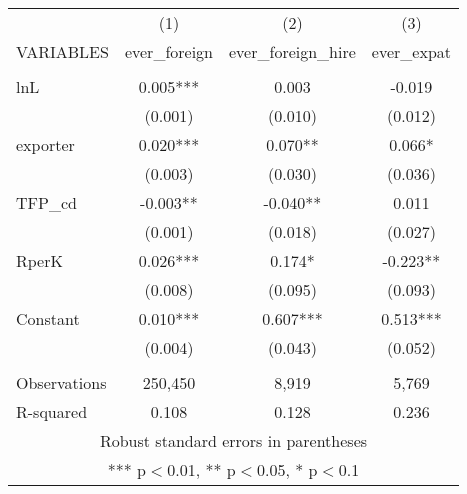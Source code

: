 \begin{tabular}{lccc} \hline
 & (1) & (2) & (3) \\
VARIABLES & ever\_foreign & ever\_foreign\_hire & ever\_expat \\ \hline
 &  &  &  \\
lnL & 0.005*** & 0.003 & -0.019 \\
 & (0.001) & (0.010) & (0.012) \\
exporter & 0.020*** & 0.070** & 0.066* \\
 & (0.003) & (0.030) & (0.036) \\
TFP\_cd & -0.003** & -0.040** & 0.011 \\
 & (0.001) & (0.018) & (0.027) \\
RperK & 0.026*** & 0.174* & -0.223** \\
 & (0.008) & (0.095) & (0.093) \\
Constant & 0.010*** & 0.607*** & 0.513*** \\
 & (0.004) & (0.043) & (0.052) \\
 &  &  &  \\
Observations & 250,450 & 8,919 & 5,769 \\
 R-squared & 0.108 & 0.128 & 0.236 \\ \hline
\multicolumn{4}{c}{ Robust standard errors in parentheses} \\
\multicolumn{4}{c}{ *** p$<$0.01, ** p$<$0.05, * p$<$0.1} \\
\end{tabular}